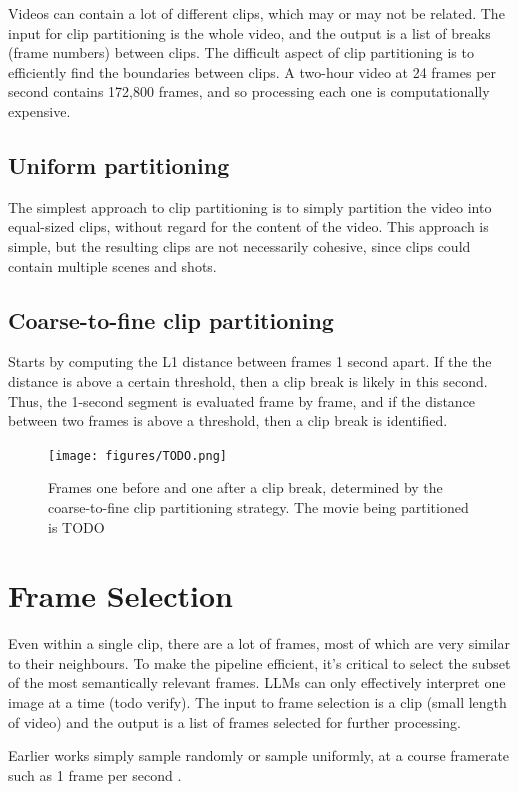 \documentclass{article}
\begin{document}
Videos can contain a lot of different clips, which may or may not be related.
The input for clip partitioning is the whole video, and the output is a list of breaks (frame numbers) between clips.
The difficult aspect of clip partitioning is to efficiently find the boundaries between clips.
A two-hour video at 24 frames per second contains 172,800 frames, and so processing each one is computationally expensive.
\subsection{Uniform partitioning}
The simplest approach to clip partitioning is to simply partition the video into equal-sized clips, without regard for the content of the video.
This approach is simple, but the resulting clips are not necessarily cohesive, since clips could contain multiple scenes and shots.
\subsection{Coarse-to-fine clip partitioning}
Starts by computing the L1 distance between frames 1 second apart.
If the the distance is above a certain threshold, then a clip break is likely in this second.
Thus, the 1-second segment is evaluated frame by frame, and if the distance between two frames is above a threshold, then a clip break is identified.

\begin{figure}
      \centering
      \texttt{[image: figures/TODO.png]}
      \caption{Frames one before and one after a clip break, determined by the coarse-to-fine clip partitioning strategy. The movie being partitioned is TODO}
      \label{fig:optical_flow}
\end{figure}


\section{Frame Selection}

Even within a single clip, there are a lot of frames, most of which are very similar to their neighbours.
To make the pipeline efficient, it's critical to select the subset of the most semantically relevant frames.
LLMs can only effectively interpret one image at a time (todo verify).
The input to frame selection is a clip (small length of video) and the output is a list of frames selected for further processing.

Earlier works simply sample randomly \cite{TODO} or sample uniformly, at a course framerate such as 1 frame per second \cite{clip4clip}.
\end{document}
